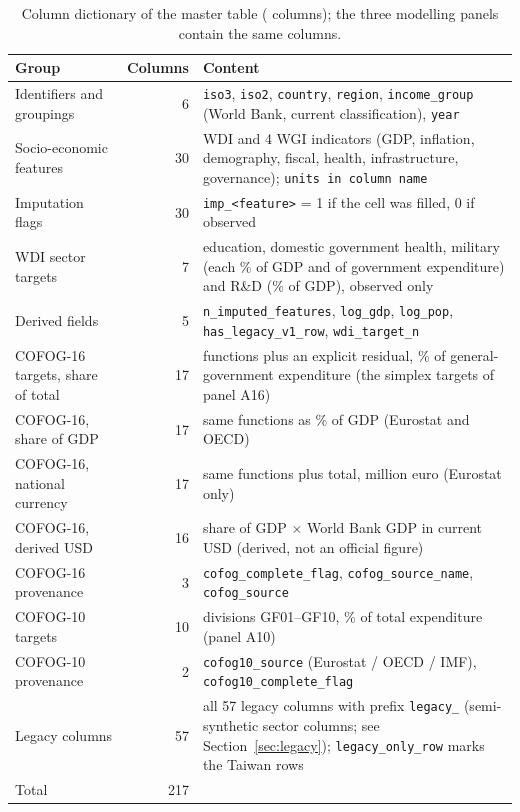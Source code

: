 \begin{table}[t]
\caption{Column dictionary of the master table (\DMasterCols{} columns); the three modelling panels contain the same columns.}\label{tab:columns}
\centering\small
\renewcommand{\arraystretch}{1.12}
\begin{tabular}{@{}>{\raggedright\arraybackslash}p{3.6cm}r>{\raggedright\arraybackslash}p{9.4cm}@{}}
\toprule
Group & Columns & Content \\
\midrule
Identifiers and groupings & 6 & \texttt{iso3}, \texttt{iso2}, \texttt{country}, \texttt{region}, \texttt{income\_group} (World Bank, current classification), \texttt{year} \\
Socio-economic features & 30 & 26 WDI and 4 WGI indicators (GDP, inflation, demography, fiscal, health, infrastructure, governance); \texttt{units in column name} \\
Imputation flags & 30 & \texttt{imp\_<feature>} = 1 if the cell was filled, 0 if observed \\
WDI sector targets & 7 & education, domestic government health, military (each \% of GDP and of government expenditure) and R\&D (\% of GDP), observed only \\
Derived fields & 5 & \texttt{n\_imputed\_features}, \texttt{log\_gdp}, \texttt{log\_pop}, \texttt{has\_legacy\_v1\_row}, \texttt{wdi\_target\_n} \\
COFOG-16 targets, share of total & 17 & 16 functions plus an explicit residual, \% of general-government expenditure (the simplex targets of panel A16) \\
COFOG-16, share of GDP & 17 & same functions as \% of GDP (Eurostat and OECD) \\
COFOG-16, national currency & 17 & same functions plus total, million euro (Eurostat only) \\
COFOG-16, derived USD & 16 & share of GDP $\times$ World Bank GDP in current USD (derived, not an official figure) \\
COFOG-16 provenance & 3 & \texttt{cofog\_complete\_flag}, \texttt{cofog\_source\_name}, \texttt{cofog\_source} \\
COFOG-10 targets & 10 & divisions GF01--GF10, \% of total expenditure (panel A10) \\
COFOG-10 provenance & 2 & \texttt{cofog10\_source} (Eurostat / OECD / IMF), \texttt{cofog10\_complete\_flag} \\
Legacy columns & 57 & all 57 legacy columns with prefix \texttt{legacy\_} (semi-synthetic sector columns; see Section~\ref{sec:legacy}); \texttt{legacy\_only\_row} marks the Taiwan rows \\
\midrule
Total & 217 & \\
\bottomrule
\end{tabular}
\end{table}
